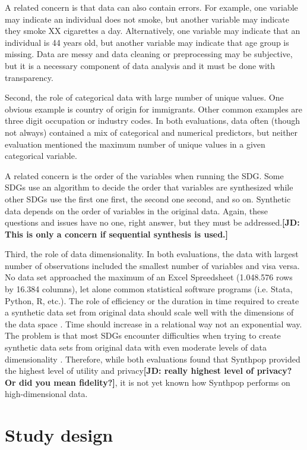 \documentclass[runningheads]{llncs}
\newcommand{\jd}[1]{\scriptsize {\bf \color{red}[JD: #1]}\normalsize}
\begin{document}
A related concern is that data can also contain errors.  For example, one variable may indicate an individual does not smoke, but another variable may indicate they smoke XX cigarettes a day.  Alternatively, one variable may indicate that an individual is 44 years old, but another variable may indicate that age group is missing.  Data are messy and data cleaning or preprocessing may be subjective, but it is a necessary component of data analysis and it must be done with transparency.

Second, the role of categorical data with large number of unique values.  One obvious example is country of origin for immigrants.  Other common examples are three digit occupation or industry codes.  In both evaluations, data often (though not always) contained a mix of categorical and numerical predictors, but neither evaluation mentioned the maximum number of unique values in a given categorical variable.  

A related concern is the order of the variables when running the SDG.  Some SDGs use an algorithm to decide the order that variables are synthesized while other SDGs use the first one first, the second one second, and so on.  Synthetic data depends on the order of variables in the original data.  Again, these questions and issues have no one, right answer, but they must be addressed.\jd{This is only a concern if sequential synthesis is used.}

Third, the role of data dimensionality.  In both evaluations, the data with largest number of observations included the smallest number of variables and visa versa.  No data set approached the maximum of an Excel Spreedsheet (1.048.576 rows by 16.384 columns), let alone common statistical software programs (i.e. Stata, Python, R, etc.).  The role of efficiency or the duration in time required to create a synthetic data set from original data should scale well with the dimensions of the data space \cite{jordon2022synthetic}.  Time should increase in a relational way not an exponential way.  The problem is that most SDGs encounter difficulties when trying to create synthetic data sets from original data with even moderate levels of data dimensionality \cite{zhang2017privbayes}.  Therefore, while both evaluations found that Synthpop provided the highest level of utility and privacy\jd{really highest level of privacy? Or did you mean fidelity?}, it is not yet known how Synthpop performs on high-dimensional data.

\section{Study design}\label{sec:study_design}
\end{document}
